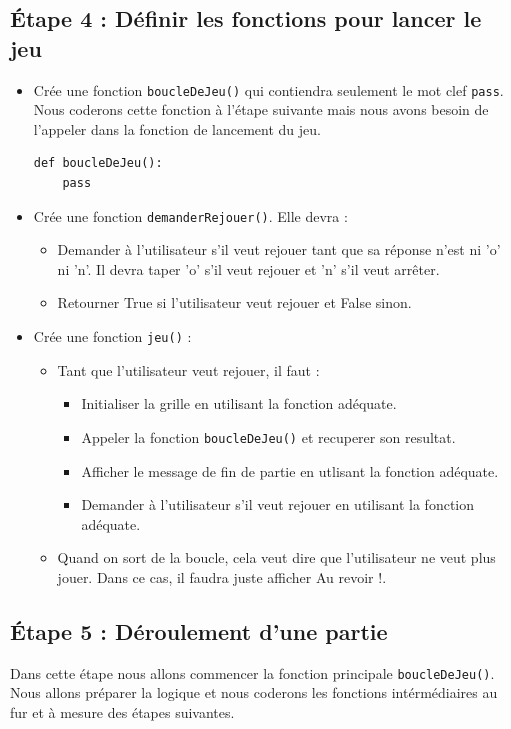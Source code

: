 \documentclass[11pt]{article}
\begin{document}
\subsection*{Étape 4 : Définir les fonctions pour lancer le jeu}
\label{puissance4_etape4}
\begin{itemize}
\item Crée une fonction \texttt{boucleDeJeu()} qui contiendra seulement le mot clef \texttt{pass}. Nous coderons cette fonction à l'étape suivante mais nous avons besoin de l'appeler dans la fonction de lancement du jeu.
\begin{verbatim}
def boucleDeJeu():
    pass
\end{verbatim}

\item Crée une fonction \texttt{demanderRejouer()}. Elle devra :
\begin{itemize}
\item Demander à l'utilisateur s'il veut rejouer tant que sa réponse n'est ni 'o' ni 'n'. Il devra taper 'o' s'il veut rejouer et 'n' s'il veut arrêter.
\item Retourner True si l'utilisateur veut rejouer et False sinon.
\end{itemize}

\item Crée une fonction \texttt{jeu()} :
\begin{itemize}
\item Tant que l'utilisateur veut rejouer, il faut :
\begin{itemize}
\item Initialiser la grille en utilisant la fonction adéquate.
\item Appeler la fonction \texttt{boucleDeJeu()} et recuperer son resultat.
\item Afficher le message de fin de partie en utlisant la fonction adéquate.
\item Demander à l'utilisateur s'il veut rejouer en utilisant la fonction adéquate.
\end{itemize}
\item Quand on sort de la boucle, cela veut dire que l'utilisateur ne veut plus jouer. Dans ce cas, il faudra juste afficher \og Au revoir !\fg{}.
\end{itemize}
\end{itemize}

\subsection*{Étape 5 : Déroulement d'une partie}
\label{puissance4_etape5}
Dans cette étape nous allons commencer la fonction principale \texttt{boucleDeJeu()}. Nous allons préparer la logique et nous coderons les fonctions intérmédiaires au fur et à mesure des étapes suivantes.
\end{document}
